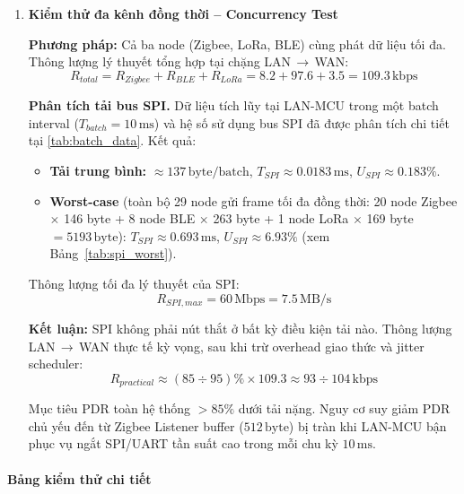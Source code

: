 \begin{enumerate}
            \item \textbf{Kiểm thử đa kênh đồng thời -- Concurrency Test}
            
            \textbf{Phương pháp:} Cả ba node (Zigbee, LoRa, BLE) cùng phát dữ liệu tối đa. Thông lượng lý thuyết tổng hợp tại chặng LAN$\,\rightarrow\,$WAN:
            \[
                R_{total} = R_{Zigbee} + R_{BLE} + R_{LoRa}
                          = 8{.}2 + 97{.}6 + 3{.}5
                          = 109{.}3\,\text{kbps}
            \]
            
            \textbf{Phân tích tải bus SPI.} Dữ liệu tích lũy tại LAN-MCU trong một batch interval ($T_{batch} = 10\,\text{ms}$) và hệ số sử dụng bus SPI đã được phân tích chi tiết tại \autoref{tab:batch_data}. Kết quả:
            
            \begin{itemize}
                \item \textbf{Tải trung bình:} $\approx 137\,\text{byte/batch}$, $T_{SPI} \approx 0{.}0183\,\text{ms}$, $U_{SPI} \approx 0{.}183\%$.
                \item \textbf{Worst-case} (toàn bộ 29 node gửi frame tối đa đồng thời: 20 node Zigbee $\times$ 146 byte + 8 node BLE $\times$ 263 byte + 1 node LoRa $\times$ 169 byte $= 5193\,\text{byte}$): $T_{SPI} \approx 0{.}693\,\text{ms}$, $U_{SPI} \approx 6{.}93\%$ (xem Bảng~\ref{tab:spi_worst}).
            \end{itemize}
            
            Thông lượng tối đa lý thuyết của SPI:
            \[
                R_{SPI,max} = 60\,\text{Mbps} = 7{.}5\,\text{MB/s}
            \]
            
            \textbf{Kết luận:} SPI không phải nút thắt ở bất kỳ điều kiện tải nào. Thông lượng LAN$\,\rightarrow\,$WAN thực tế kỳ vọng, sau khi trừ overhead giao thức và jitter scheduler:
            \[
                R_{practical} \approx (85 \div 95)\% \times 109{.}3 \approx 93 \div 104\,\text{kbps}
            \]
            
            Mục tiêu PDR toàn hệ thống $> 85\%$ dưới tải nặng. Nguy cơ suy giảm PDR chủ yếu đến từ Zigbee Listener buffer ($512\,\text{byte}$) bị tràn khi LAN-MCU bận phục vụ ngắt SPI/UART tần suất cao trong mỗi chu kỳ $10\,\text{ms}$.
            
        \end{enumerate}

        \paragraph{Bảng kiểm thử chi tiết}


